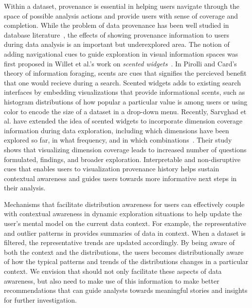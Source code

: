 \par Within a dataset, provenance is essential in helping users navigate through the space of possible analysis actions and provide users with sense of coverage and completion. While the problem of data provenance has been well studied in database literature~\cite{Buneman2006,Cui2003,Woodruff1997}, the effects of showing provenance information to users during data analysis is an important but underexplored area. The notion of adding navigational cues to guide exploration in visual information spaces was first proposed in Willet et al.'s work on \textit{scented widgets}~\cite{Willett2007}. In Pirolli and Card's theory of information foraging, scents are cues that signifies the percieved benefit that one would recieve during a search. Scented widgets adds to existing search interfaces by embedding visualizations that provide informational scents, such as histogram distributions of how popular a particular value is among users or using color to encode the size of a dataset in a drop-down menu. Recently, Sarvghad et al. have extended the idea of scented widgets to incorporate dimension coverage information during data exploration, including which dimensions have been explored so far, in what frequency, and in which combinations~\cite{Sarvghad2017}. Their study shows that visualizing dimension coverage leads to increased number of questions formulated, findings, and broader exploration. Interpretable and non-disruptive cues that enables users to visualization provenance history helps sustain contextual awareness and guides users towards more informative next steps in their analysis.%
\par Mechanisms that facilitate distribution awareness for users can effectively couple with contextual awareness in dynamic exploration situations to help update the user's mental model on the current data context. For example, the representative and outlier patterns in \zv provides summaries of data in context. When a dataset is filtered, the representative trends are updated accordingly. By being aware of both the context and the distributions, the users becomes distributionally aware of how the typical patterns and trends of the distributions changes in a particular context. %
We envision that \vida should not only facilitate these aspects of data awareness, but also need to make use of this information to make better recommendations that can guide analysts towards meaningful stories and insights for further investigation.

